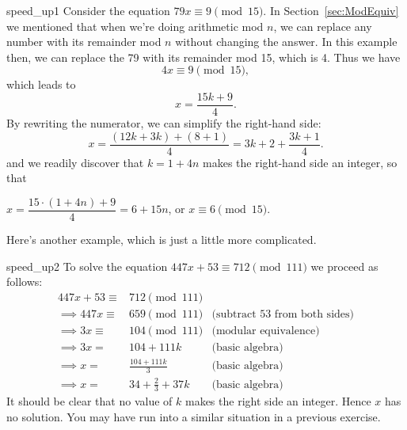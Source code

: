 \begin{example}{speed_up1}
Consider the equation $79x \equiv 9 \pmod{15}$. In Section~\ref{sec:ModEquiv} we mentioned that when we're doing arithmetic mod $n$, we can replace any number with its remainder mod $n$ without changing the answer. In this example then, we can replace the 79 with its remainder mod 15, which is 4. Thus we have
\[ 4x \equiv 9 \pmod{15}, \]
which leads to 
\[ x = \dfrac{15k +9}{4}. \]
By rewriting the numerator, we can simplify the right-hand side:
\[ x = \dfrac{(12k + 3k) + (8 + 1)}{4} = 3k + 2 + \dfrac{3k + 1}{4}. \]
and we readily discover that $k=1 + 4n$ makes the right-hand side an integer, so that 

\begin{center}
$x = \dfrac{15\cdot(1+4n) +9}{4} = 6+15n$, or $x \equiv 6 \pmod{15}$.
\end{center}

\end{example}

Here's another example, which is just a little more complicated. 

\begin{example}{speed_up2}
To solve the equation $447x + 53 \equiv 712 \pmod{111}$ we proceed as follows:
\begin{align*}
447x + 53 \equiv& 712 \pmod{111} \\
\implies 447x \equiv& 659 \pmod{111} & \text{(subtract 53 from both sides)}\\
\implies 3x  \equiv& 104 \pmod{111} &\text{(modular equivalence)} \\
 \implies 3x  =& 104 + 111k &\text{(basic algebra)}\\ 
 \implies x =& \frac{104 +111k}{3} &\text{(basic algebra)}\\
 \implies x =& 34+\frac{2}{3} + 37k &\text{(basic algebra)}
 \end{align*}
It should be clear that no value of $k$  makes the right side an integer.  Hence $x$ has no solution. You may have run into a similar situation in a previous exercise.
\end{example}


